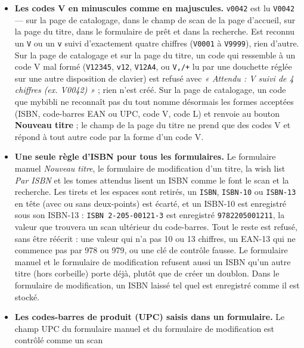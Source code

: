 \begin{itemize}
  \item \textbf{Les codes V en minuscules comme en majuscules.}
        \texttt{v0042} est lu \texttt{V0042} --- sur la page de
        catalogage, dans le champ de scan de la page d'accueil, sur la
        page du titre, dans le formulaire de prêt et dans la
        recherche. Est reconnu un
        \texttt{V} ou un \texttt{v} suivi d'exactement quatre chiffres
        (\texttt{V0001} à \texttt{V9999}), rien d'autre. Sur la page de
        catalogage et sur la page du titre, un code qui ressemble à un
        code V mal formé
        (\texttt{V12345}, \texttt{v12}, \texttt{V12A4}, ou
        \texttt{V,/+} lu par une douchette réglée sur une autre
        disposition de clavier) est refusé avec \emph{« Attendu : V
        suivi de 4 chiffres (ex. V0042) »} ; rien n'est créé. Sur la page de
        catalogage, un code que mybibli ne reconnaît pas du tout nomme désormais les formes
        acceptées (ISBN, code-barres EAN ou UPC, code V, code L) et
        renvoie au bouton \textbf{Nouveau titre} ; le champ de la page
        du titre ne prend que des codes V et répond à tout autre code par
        la forme d'un code V.
  \item \textbf{Une seule règle d'ISBN pour tous les
        formulaires.} Le formulaire manuel \emph{Nouveau
        titre}, le formulaire de modification d'un titre, la wish list
        \emph{Par ISBN} et les tomes attendus lisent un ISBN comme le
        font le scan et la recherche. Les tirets et les espaces sont
        retirés, un \texttt{ISBN}, \texttt{ISBN-10} ou \texttt{ISBN-13}
        en tête (avec ou sans deux-points) est écarté, et un ISBN-10 est
        enregistré sous son ISBN-13 : \texttt{ISBN 2-205-00121-3} est
        enregistré \texttt{9782205001211}, la valeur que trouvera un
        scan ultérieur du code-barres. Tout le reste est refusé, sans être
        réécrit : une valeur qui n'a pas 10 ou 13
        chiffres, un EAN-13 qui ne commence pas par 978 ou 979, ou une
        clé de contrôle fausse. Le formulaire manuel et le
        formulaire de modification refusent aussi un ISBN qu'un autre
        titre (hors corbeille) porte déjà, plutôt que de créer un
        doublon. Dans le formulaire de modification, un
        ISBN laissé tel quel est enregistré comme il est stocké.
  \item \textbf{Les codes-barres de produit (UPC) saisis dans un
        formulaire.} Le champ UPC du formulaire manuel et du formulaire
        de modification est contrôlé comme un scan

\end{itemize}
